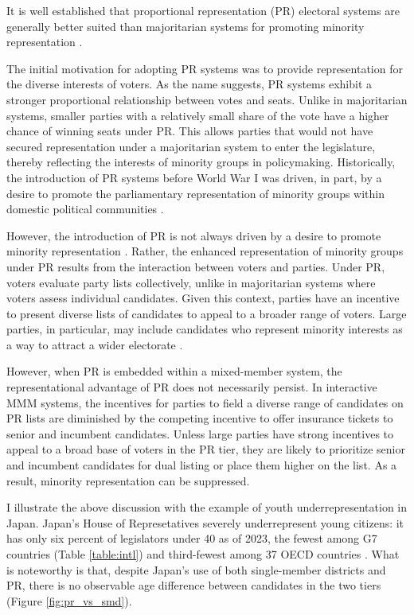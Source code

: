 \documentclass[a4paper, 11pt]{article}
\begin{document}
It is well established that proportional representation (PR) electoral systems are generally better suited than majoritarian systems for promoting minority representation \citep{matlandContagionWomenCandidates1996, matlandWomensRepresentationNational1998, meserveGenderIncumbencyParty2020}. 

The initial motivation for adopting PR systems was to provide representation for the diverse interests of voters. As the name suggests, PR systems exhibit a stronger proportional relationship between votes and seats. Unlike in majoritarian systems, smaller parties with a relatively small share of the vote have a higher chance of winning seats under PR. This allows parties that would not have secured representation under a majoritarian system to enter the legislature, thereby reflecting the interests of minority groups in policymaking. Historically, the introduction of PR systems before World War I was driven, in part, by a desire to promote the parliamentary representation of minority groups within domestic political communities \citep{rokkanCitizensElectionsParties1970}.

However, the introduction of PR is not always driven by a desire to promote minority representation \citep{ahmedReadingHistoryForward2010, boixSettingRulesGame1999, cusackEconomicInterestsOrigins2007}. Rather, the enhanced representation of minority groups under PR results from the interaction between voters and parties. Under PR, voters evaluate party lists collectively, unlike in majoritarian systems where voters assess individual candidates. Given this context, parties have an incentive to present diverse lists of candidates to appeal to a broader range of voters. Large parties, in particular, may include candidates who represent minority interests as a way to attract a wider electorate \citep[p.188]{norrisElectoralEngineeringVoting2004}.

However, when PR is embedded within a mixed-member system, the representational advantage of PR does not necessarily persist. In interactive MMM systems, the incentives for parties to field a diverse range of candidates on PR lists are diminished by the competing incentive to offer insurance tickets to senior and incumbent candidates. Unless large parties have strong incentives to appeal to a broad base of voters in the PR tier, they are likely to prioritize senior and incumbent candidates for dual listing or place them higher on the list. As a result, minority representation can be suppressed.

I illustrate the above discussion with the example of youth underrepresentation in Japan. Japan's House of Represetatives severely underrepresent young citizens: it has only six percent of legislators under 40 as of 2023, the fewest among G7 countries (Table \ref{table:intl}) and third-fewest among 37 OECD countries \citep{mccleanSilverDemocracyYouth2020}. What is noteworthy is that, despite Japan’s use of both single-member districts and PR, there is no observable age difference between candidates in the two tiers (Figure \ref{fig:pr_vs_smd}).
\end{document}
